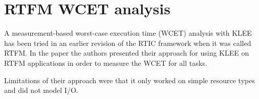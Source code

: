 \section{RTFM WCET analysis}
A measurement-based worst-case execution time (WCET) analysis with KLEE has
been tried in an earlier revision of the RTIC framework\cite{lindner} when it was
called RTFM. In the paper the authors presented their approach for using KLEE on
RTFM applications in order to measure the WCET for all tasks. 

Limitations of their approach were that it only worked on simple resource types and
did not model I/O.
